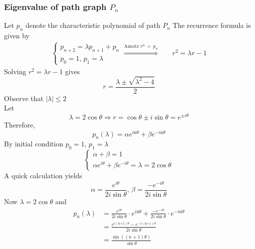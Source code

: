 \documentclass[11pt]{article}
\begin{document}
\subsubsection{Eigenvalue of path graph $P_n$ }
Let $p_n$ denote the characteristic polynomial of path $P_n$
The recurrence formula is given by
\begin{align*}
    \begin{cases}
        p_{n+2} = \lambda p_{n+1} + p_n\\
        p_0 = 1, \,p_1 = \lambda
    \end{cases}
    \overset{\text{Ansatz } r^n\,=\,p_n}{\Rightarrow}
    \quad
    &r^2 = \lambda r - 1
\end{align*}
Solving $r^2 = \lambda r - 1$ gives 
\[
    r = \frac{\lambda \pm \sqrt{\lambda^2-4}}{2}
\]
Observe that $|\lambda|\leq 2$\\
Let 
\[
    \lambda = 2\cos\theta \Rightarrow r=\cos\theta \pm i\sin\theta = e^{\pm i\theta}
\]
Therefore,
\[
    p_n(\lambda)=\alpha e^{i\text{n}\theta} + \beta e^{-i\text{n}\theta}
\]
By initial condition $p_0 = 1, \,p_1=\lambda$
\[
    \begin{cases}
        \alpha + \beta = 1\\[.5em]
        \alpha e^{i\theta} + \beta e^{-i\theta}=\lambda=2\cos\theta
    \end{cases}
\]
A quick calculation yields
\[
    \alpha = \frac{e^{i\theta}}{2i\sin\theta},\,\beta = \frac{-e^{-i\theta}}{2i\sin\theta}
\]
Now $\lambda = 2\cos\theta$ and
\[
    \begin{split}
        p_n(\lambda)&=\frac{e^{i\theta}}{2i\sin\theta}\cdot e^{i\text{n}\theta} + \frac{-e^{-i\theta}}{2i\sin\theta}\cdot e^{-i\text{n}\theta}\\[.5em]
        &=\frac{e^{i(\text{n+1})\theta}-e^{-i(\text{n+1})\theta}}{2i\sin\theta}\\[.5em]
        &=\frac{\sin((n+1)\theta)}{\sin\theta}
    \end{split}
\]
\end{document}
